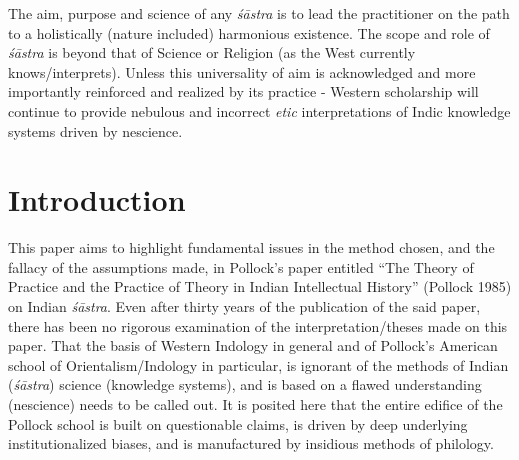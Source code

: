 The aim, purpose and science of any {\sl śāstra} is to lead the practitioner on the path to a holistically (nature included) harmonious existence. The scope and role of {\sl śāstra} is beyond that of Science or Religion (as the West currently knows/interprets). Unless this universality of aim is acknowledged and more importantly reinforced and realized by its practice - Western scholarship will continue to provide nebulous and incorrect {\sl etic} interpretations of Indic knowledge systems driven by nescience.

\section*{Introduction}

This paper aims to highlight fundamental issues in the method chosen, and the fallacy of the assumptions made, in Pollock's paper entitled ``The Theory of Practice and the Practice of Theory in Indian Intellectual History'' (Pollock 1985) on Indian {\sl śāstra}. Even after thirty years of the publication of the said paper, there has been no rigorous examination of the interpretation/theses made on this paper. That the basis of Western Indology in general and of Pollock's American school of Orientalism/Indology in particular, is ignorant of the methods of Indian ({\sl śāstra}) science (knowledge systems), and is based on a flawed understanding (nescience) needs to be called out. It is posited here that the entire edifice of the Pollock school is built on questionable claims, is driven by deep underlying institutionalized biases, and is manufactured by insidious methods of philology. 

